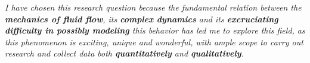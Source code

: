 \textit{I have chosen this research question because the fundamental relation between the \textbf{mechanics of fluid flow}, its \textbf{complex dynamics} and its \textbf{excruciating difficulty in possibly modeling} this behavior has led me to explore this field, as this phenomenon is exciting, unique and wonderful, with ample scope to carry out research and collect data both \textbf{quantitatively} and \textbf{qualitatively}.}

